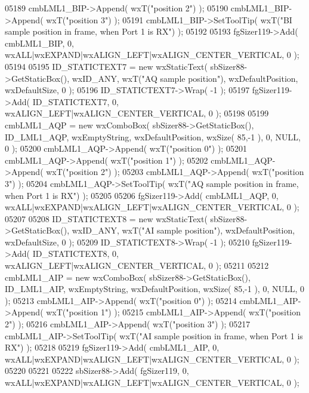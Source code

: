 \begin{DoxyCode}
05189     cmbLML1_BIP->Append( wxT(\textcolor{stringliteral}{"position 2"}) );
05190     cmbLML1_BIP->Append( wxT(\textcolor{stringliteral}{"position 3"}) );
05191     cmbLML1_BIP->SetToolTip( wxT(\textcolor{stringliteral}{"BI sample position in frame, when Port 1 is RX"}) );
05192     
05193     fgSizer119->Add( cmbLML1_BIP, 0, wxALL|wxEXPAND|wxALIGN\_LEFT|wxALIGN\_CENTER\_VERTICAL, 0 );
05194     
05195     ID_STATICTEXT7 = \textcolor{keyword}{new} wxStaticText( sbSizer88->GetStaticBox(), wxID\_ANY, wxT(\textcolor{stringliteral}{"AQ sample position"}), 
      wxDefaultPosition, wxDefaultSize, 0 );
05196     ID_STATICTEXT7->Wrap( -1 );
05197     fgSizer119->Add( ID_STATICTEXT7, 0, wxALIGN\_LEFT|wxALIGN\_CENTER\_VERTICAL, 0 );
05198     
05199     cmbLML1_AQP = \textcolor{keyword}{new} wxComboBox( sbSizer88->GetStaticBox(), ID_LML1_AQP, wxEmptyString, wxDefaultPosition,
       wxSize( 85,-1 ), 0, NULL, 0 );
05200     cmbLML1_AQP->Append( wxT(\textcolor{stringliteral}{"position 0"}) );
05201     cmbLML1_AQP->Append( wxT(\textcolor{stringliteral}{"position 1"}) );
05202     cmbLML1_AQP->Append( wxT(\textcolor{stringliteral}{"position 2"}) );
05203     cmbLML1_AQP->Append( wxT(\textcolor{stringliteral}{"position 3"}) );
05204     cmbLML1_AQP->SetToolTip( wxT(\textcolor{stringliteral}{"AQ sample position in frame, when Port 1 is RX"}) );
05205     
05206     fgSizer119->Add( cmbLML1_AQP, 0, wxALL|wxEXPAND|wxALIGN\_LEFT|wxALIGN\_CENTER\_VERTICAL, 0 );
05207     
05208     ID_STATICTEXT8 = \textcolor{keyword}{new} wxStaticText( sbSizer88->GetStaticBox(), wxID\_ANY, wxT(\textcolor{stringliteral}{"AI sample position"}), 
      wxDefaultPosition, wxDefaultSize, 0 );
05209     ID_STATICTEXT8->Wrap( -1 );
05210     fgSizer119->Add( ID_STATICTEXT8, 0, wxALIGN\_LEFT|wxALIGN\_CENTER\_VERTICAL, 0 );
05211     
05212     cmbLML1_AIP = \textcolor{keyword}{new} wxComboBox( sbSizer88->GetStaticBox(), ID_LML1_AIP, wxEmptyString, wxDefaultPosition,
       wxSize( 85,-1 ), 0, NULL, 0 );
05213     cmbLML1_AIP->Append( wxT(\textcolor{stringliteral}{"position 0"}) );
05214     cmbLML1_AIP->Append( wxT(\textcolor{stringliteral}{"position 1"}) );
05215     cmbLML1_AIP->Append( wxT(\textcolor{stringliteral}{"position 2"}) );
05216     cmbLML1_AIP->Append( wxT(\textcolor{stringliteral}{"position 3"}) );
05217     cmbLML1_AIP->SetToolTip( wxT(\textcolor{stringliteral}{"AI sample position in frame, when Port 1 is RX"}) );
05218     
05219     fgSizer119->Add( cmbLML1_AIP, 0, wxALL|wxEXPAND|wxALIGN\_LEFT|wxALIGN\_CENTER\_VERTICAL, 0 );
05220     
05221     
05222     sbSizer88->Add( fgSizer119, 0, wxALL|wxEXPAND|wxALIGN\_LEFT|wxALIGN\_CENTER\_VERTICAL, 0 );

\end{DoxyCode}
